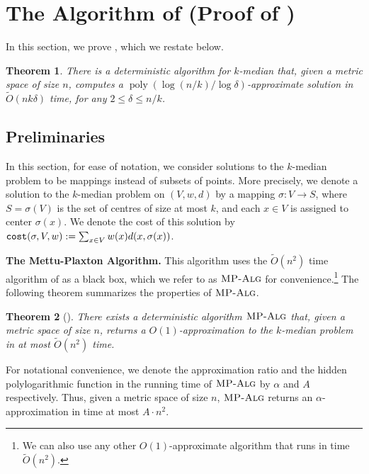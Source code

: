 \documentclass[11pt]{article}
\newcommand{\1}{\mathmybb{1}}
\newtheorem{theorem}{Theorem}[section]
\DeclareMathOperator*{\poly}{poly}
\newcommand{\cost}{\textnormal{\texttt{cost}}}
\newcommand{\MPAlg}{\textnormal{\textsc{MP-Alg}}}
\begin{document}
\newpage

\appendix

\section{The Algorithm of \cite{focs/GuhaMMO00} (Proof of )}\label{sec:guha alg}

In this section, we prove , which we restate below.

\begin{theorem}\label{thm:main:time:restate}
    There is a deterministic algorithm for $k$-median that, given a metric space of size $n$, computes a $\poly(\log(n/k) / \log \delta)$-approximate solution in $\tilde O(nk\delta)$ time, for any $2 \leq \delta \leq n/k$.
\end{theorem}

\subsection{Preliminaries}

In this section, for ease of notation, we consider solutions to the $k$-median problem to be mappings instead of subsets of points.
More precisely, we denote a solution to the $k$-median problem on $(V,w,d)$ by a mapping $\sigma : V \longrightarrow S$, where $S = \sigma(V)$ is the set of centres of size at most $k$, and each $x \in V$ is assigned to center $\sigma(x)$.
We denote the cost of this solution by
$\cost(\sigma,V,w) := \sum_{x \in V} w(x)d(x, \sigma(x))$.



\medskip
\noindent\textbf{The Mettu-Plaxton Algorithm.}
This algorithm uses the $\tilde O(n^2)$ time algorithm of \cite{MettuP00} as a black box, which we refer to as $\MPAlg$ for convenience.\footnote{We can also use any other $O(1)$-approximate algorithm that runs in time $\tilde O(n^2)$.} The following theorem summarizes the properties of $\MPAlg$.

\begin{theorem}[\cite{MettuP00}]\label{thm:MP alg} There exists a deterministic algorithm $\MPAlg$ that, given a metric space of size $n$, returns a $O(1)$-approximation to the $k$-median problem in at most $\tilde O(n^2)$ time.
\end{theorem}

For notational convenience, we denote the approximation ratio and the hidden polylogarithmic function in the running time of $\MPAlg$ by $\alpha$ and $A$ respectively. Thus, given a metric space of size $n$, $\MPAlg$ returns an $\alpha$-approximation in time at most $A \cdot n^2$.
\end{document}
